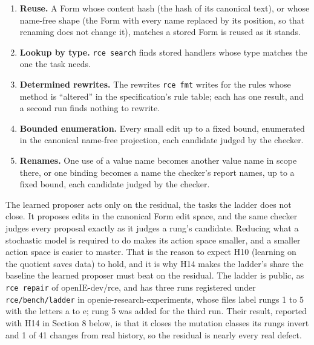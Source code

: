 \documentclass[10pt,letterpaper]{article}
\providecommand{\tightlist}{\setlength{\itemsep}{1pt}\setlength{\parskip}{0pt}}
\begin{document}
\begin{enumerate}
\def\labelenumi{\arabic{enumi}.}
\tightlist
\item
  \textbf{Reuse.} A Form whose content hash (the hash of its canonical
  text), or whose name-free shape (the Form with every name replaced by
  its position, so that renaming does not change it), matches a stored
  Form is reused as it stands.
\item
  \textbf{Lookup by type.} \texttt{rce\ search} finds stored handlers
  whose type matches the one the task needs.
\item
  \textbf{Determined rewrites.} The rewrites \texttt{rce\ fmt} writes
  for the rules whose method is ``altered'' in the specification's rule
  table; each has one result, and a second run finds nothing to rewrite.
\item
  \textbf{Bounded enumeration.} Every small edit up to a fixed bound,
  enumerated in the canonical name-free projection, each candidate
  judged by the checker.
\item
  \textbf{Renames.} One use of a value name becomes another value name
  in scope there, or one binding becomes a name the checker's report
  names, up to a fixed bound, each candidate judged by the checker.
\end{enumerate}

The learned proposer acts only on the residual, the tasks the ladder
does not close. It proposes edits in the canonical Form edit space, and
the same checker judges every proposal exactly as it judges a rung's
candidate. Reducing what a stochastic model is required to do makes its
action space smaller, and a smaller action space is easier to master.
That is the reason to expect H10 (learning on the quotient saves data)
to hold, and it is why H14 makes the ladder's share the baseline the
learned proposer must beat on the residual. The ladder is public, as
\texttt{rce\ repair} of openIE-dev/rce, and has three runs registered
under \texttt{rce/\allowbreak{}bench/\allowbreak{}ladder} in openie-research-experiments, whose
files label rungs 1 to 5 with the letters a to e; rung 5 was added for
the third run. Their result, reported with H14 in Section 8 below, is
that it closes the mutation classes its rungs invert and 1 of 41 changes
from real history, so the residual is nearly every real defect.
\end{document}
